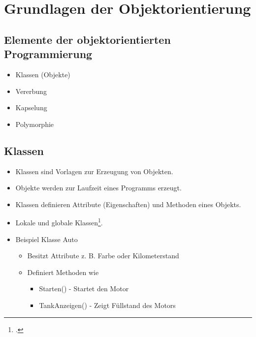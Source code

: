 \section{Grundlagen der Objektorientierung}

\subsection{Elemente der objektorientierten Programmierung}
\begin{itemize}
    \item Klassen (Objekte)
    \item Vererbung
    \item Kapselung
    \item Polymorphie
\end{itemize}

\subsection{Klassen}
\begin{itemize}
    \item Klassen sind Vorlagen zur Erzeugung von Objekten.
    \item Objekte werden zur Laufzeit eines Programms erzeugt.
    \item Klassen definieren Attribute (Eigenschaften) und Methoden eines Objekts.
    \item Lokale und globale Klassen\footcite[Vgl.][S. 4]{zaidiSAPABAPObjects2019}. 
    \item Beispiel Klasse Auto
    \begin{itemize}
        \item Besitzt Attribute z. B. Farbe oder Kilometerstand
        \item Definiert Methoden wie
        \begin{itemize}
            \item Starten() - Startet den Motor
            \item TankAnzeigen() - Zeigt Füllstand des Motors
        \end{itemize}
    \end{itemize}
\end{itemize}

